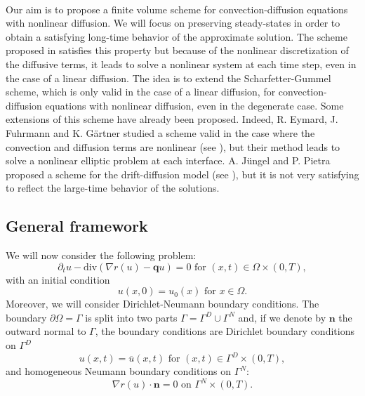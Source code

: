 \documentclass[smallextended]{svjour3}
\def\pa{\partial}
\def\pa{\partial}
\begin{document}
\paragraph*{}Our aim is to propose a finite volume scheme for convection-diffusion equations with nonlinear diffusion. We will focus on preserving steady-states in order to obtain a satisfying long-time behavior of the approximate solution. The scheme proposed in \cite{Chainais-Hillairet2007} satisfies this property but because of the nonlinear discretization of the diffusive terms, it leads to solve a nonlinear system at each time step, even in the case of a linear diffusion. The idea is to extend the Scharfetter-Gummel scheme, which is only valid in the case of a linear diffusion, for convection-diffusion equations with nonlinear diffusion, even in the degenerate case. Some extensions of this scheme have already been proposed. Indeed, R. Eymard, J. Fuhrmann and K. Gärtner studied a scheme valid in the case where the convection and diffusion terms are nonlinear (see \cite{Eymard2006}), but their method leads to solve a nonlinear elliptic problem at each interface. A. Jüngel and P. Pietra proposed a scheme for the drift-diffusion model (see \cite{Juengel1995,Juengel1997}), but it is not very satisfying to reflect the large-time behavior of the solutions.



\subsection{General framework}

We will now consider the following problem:
\begin{equation}
\pa_{t}u-\text{div}(\nabla r(u)-\mathbf{q}u)=0 \text{ for } (x,t) \in \Omega \times (0,T),
\label{eq}
\end{equation}
with an initial condition 
\begin{equation}
u(x,0)=u_{0}(x) \text{ for } x \in \Omega.
\label{CI}
\end{equation}
Moreover, we will consider Dirichlet-Neumann boundary conditions. The boundary $\pa \Omega=\Gamma$ is split into two parts $\Gamma=\Gamma^{D} \cup \Gamma^{N}$ and, if we denote by $\mathbf{n}$ the outward normal to $\Gamma$, the boundary conditions are Dirichlet boundary conditions on $\Gamma^{D}$
\begin{equation}
u(x,t)=\overline{u}(x,t) \text{ for } (x,t) \in \Gamma^{D} \times (0,T),
\label{BCD}
\end{equation}
and homogeneous Neumann boundary conditions on $\Gamma^{N}$:
\begin{equation}
\nabla r(u) \cdot \mathbf{n}=0 \text{ on } \Gamma^{N} \times (0,T).
\label{BCN}
\end{equation}
\end{document}
